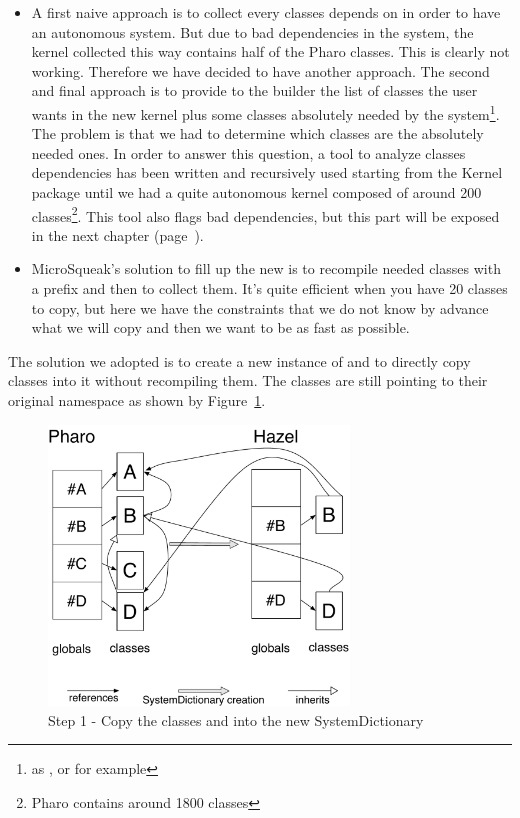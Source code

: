 \solutions
\begin{itemize}
	\item A first naive approach is to collect every classes  depends on in order to have an autonomous system. But due to bad dependencies in the system, the kernel collected this way contains half of the \gls{Pharo} classes. This is clearly not working. Therefore we have decided to have another approach. The second and final approach is to provide to the builder the list of classes the user wants in the new kernel plus some classes absolutely needed by the system\footnote{as ,  or  for example}. The problem is that we had to determine which classes are the absolutely needed ones. In order to answer this question, a tool to analyze classes dependencies has been written and recursively used starting from the Kernel package until we had a quite autonomous kernel composed of around 200 classes\footnote{\gls{Pharo} contains around 1800 classes}. This tool also flags bad dependencies, but this part will be exposed in the next chapter (page~\pageref{KernelIsolation}). 


	\item MicroSqueak's solution to fill up the new  is to recompile needed classes with a prefix and then to collect them. It's quite efficient when you have 20 classes to copy, but here we have the constraints that we do not know by advance what we will copy and then we want to be as fast as possible. 
\end{itemize}	
	
The solution we adopted is to create a new instance of  and to directly copy classes into it without recompiling them. The classes are still pointing to their original namespace as shown by Figure~\ref{ClassesCopy}.
	
\begin{figure}[h]
	\centering\includegraphics[width = 8cm]{figures/CopyWithInh}
	\caption{Step 1 - Copy the classes  and  into the new SystemDictionary}
	\label{ClassesCopy}
\end{figure}
	
